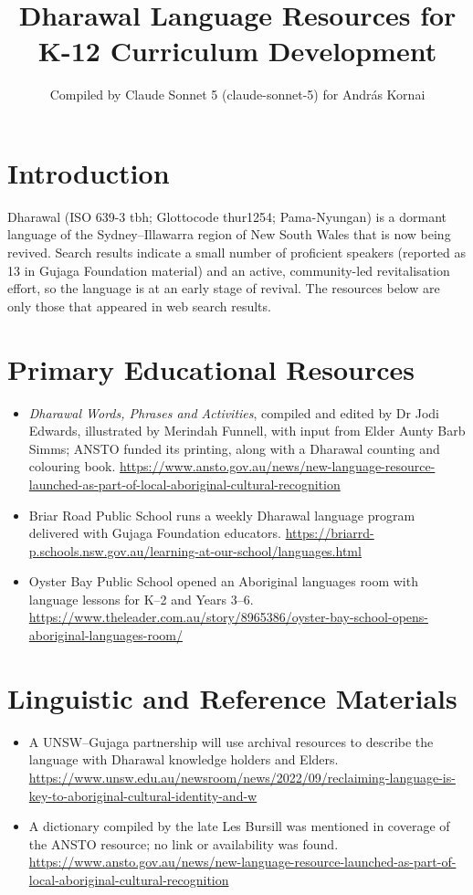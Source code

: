 \documentclass[12pt]{article}
\title{Dharawal Language Resources for K-12 Curriculum Development}
\author{Compiled by Claude Sonnet 5 (claude-sonnet-5) for Andr\'as Kornai}
\date{}
\begin{document}
\maketitle
\section{Introduction}
Dharawal (ISO 639-3 tbh; Glottocode thur1254; Pama-Nyungan) is a dormant language of the Sydney--Illawarra region of New South Wales that is now being revived. Search results indicate a small number of proficient speakers (reported as 13 in Gujaga Foundation material) and an active, community-led revitalisation effort, so the language is at an early stage of revival. The resources below are only those that appeared in web search results.
\section{Primary Educational Resources}
\begin{itemize}
\item \emph{Dharawal Words, Phrases and Activities}, compiled and edited by Dr Jodi Edwards, illustrated by Merindah Funnell, with input from Elder Aunty Barb Simms; ANSTO funded its printing, along with a Dharawal counting and colouring book. \url{https://www.ansto.gov.au/news/new-language-resource-launched-as-part-of-local-aboriginal-cultural-recognition}
\item Briar Road Public School runs a weekly Dharawal language program delivered with Gujaga Foundation educators. \url{https://briarrd-p.schools.nsw.gov.au/learning-at-our-school/languages.html}
\item Oyster Bay Public School opened an Aboriginal languages room with language lessons for K--2 and Years 3--6. \url{https://www.theleader.com.au/story/8965386/oyster-bay-school-opens-aboriginal-languages-room/}
\end{itemize}
\section{Linguistic and Reference Materials}
\begin{itemize}
\item A UNSW--Gujaga partnership will use archival resources to describe the language with Dharawal knowledge holders and Elders. \url{https://www.unsw.edu.au/newsroom/news/2022/09/reclaiming-language-is-key-to-aboriginal-cultural-identity-and-w}
\item A dictionary compiled by the late Les Bursill was mentioned in coverage of the ANSTO resource; no link or availability was found. \url{https://www.ansto.gov.au/news/new-language-resource-launched-as-part-of-local-aboriginal-cultural-recognition}
\end{itemize}
\end{document}
